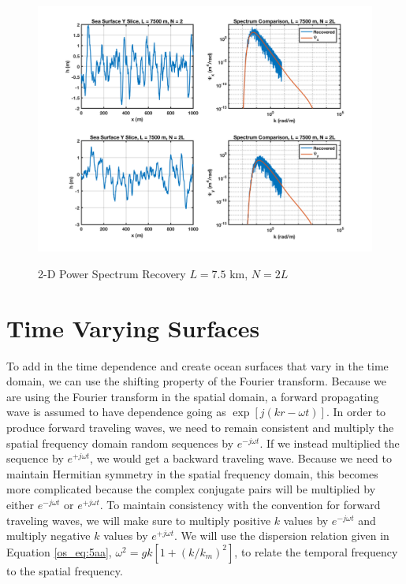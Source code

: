 \begin{figure}[H]
  \begin{center}
\includegraphics[width=6in]{../media/Ocean_Surface/sea_surface_2d_slices_7500.png}
  \end{center}
  \renewcommand{\baselinestretch}{1} \small\normalsize
  \begin{quote}
    \caption[2-D Power Spectrum Recovery $L = 7.5$ km, $N = 2L$]{2-D Power Spectrum Recovery $L = 7.5$ km, $N = 2L$\label{os_fig:12a}}
  \end{quote}
\end{figure}
\renewcommand{\baselinestretch}{2} \small\normalsize

\section {Time Varying Surfaces}
To add in the time dependence and create ocean surfaces that vary in the time domain, we can use the shifting property of the Fourier transform. Because we are using the Fourier transform in the spatial domain, a forward propagating wave is assumed to have dependence going as $\exp[j(kr - \omega t)]$. In order to produce forward traveling waves, we need to remain consistent and multiply the spatial frequency domain random sequences by $e^{-j\omega t}$. If we instead multiplied the sequence by $e^{+j\omega t}$, we would get a backward traveling wave. Because we need to maintain Hermitian symmetry in the spatial frequency domain, this becomes more complicated because the complex conjugate pairs will be multiplied by either $e^{-j\omega t}$ or $e^{+j\omega t}$. To maintain consistency with the convention for forward traveling waves, we will make sure to multiply positive $k$ values by $e^{-j\omega t}$ and multiply negative $k$ values by $e^{+j\omega t}$. We will use the dispersion relation given in Equation \ref{os_eq:5aa}, $\omega^2 = gk\left[1 +(k/k_m)^2 \right]$, to relate the temporal frequency to the spatial frequency. 

